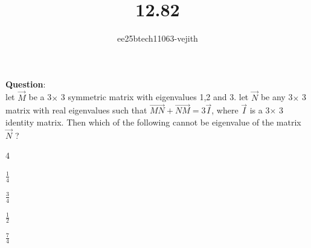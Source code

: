 \documentclass[journal]{IEEEtran}
\begin{document}

\vspace{3cm}

\title{12.82}
\author{ee25btech11063-vejith}

\maketitle
{\let\newpage\relax\maketitle}
\renewcommand{\thefigure}{\theenumi}
\renewcommand{\thetable}{\theenumi}
\setlength{\intextsep}{10pt} %
\textbf{Question}:\\
let $\Vec{M}$ be a 3$\times$ 3 symmetric matrix with eigenvalues 1,2 and 3. let $\Vec{N}$ be any 3$\times$ 3  matrix with real eigenvalues such that $\Vec{MN} + \Vec{NM}= 3\Vec{I}$, where $\Vec{I}$ is a 3$\times$ 3  identity matrix. Then which of the following cannot be eigenvalue of the matrix $\Vec{N}$ ?
\hspace{2cm}
\begin{enumerate}[label=\alph*)]
    \begin{multicols}{4}
  \item $\frac{1}{4}$        
  \item $\frac{3}{4}$
  \item $\frac{1}{2}$
  \item $\frac{7}{4}$  
    \end{multicols}
\end{enumerate}
\end{document}
